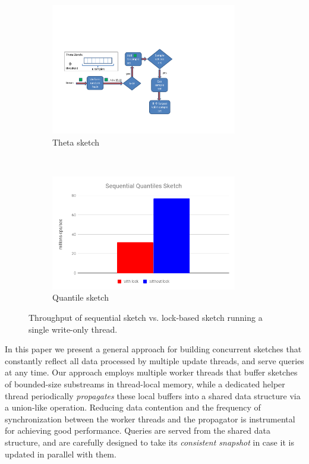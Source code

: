 \begin{figure}[t!]
    \centering
    \begin{subfigure}[t]{0.49\textwidth}
        \centering
        \includegraphics[width=3.2in]{images/seqTheta}
        \caption{Theta sketch}
        \label{fig:LockIsBadTheta}
    \end{subfigure}%
    ~ 
    \begin{subfigure}[t]{0.49\textwidth}
        \centering
        \includegraphics[width=3.2in]{images/seqQuantiles}
        \caption{Quantile sketch}
        \label{fig:LockIsBadQuantiles}
    \end{subfigure}
    \caption{Throughput of sequential sketch vs. lock-based sketch running a single write-only thread.}
    \label{fig:lockBased}
\end{figure}



In this paper 
we present a general approach for building concurrent sketches that
constantly reflect all data processed by multiple update threads, 
and serve queries at any time. %
Our  approach employs multiple worker threads that buffer sketches of bounded-size substreams in thread-local memory, while a dedicated helper thread 
periodically \emph{propagates} these local buffers into a shared data structure via a union-like operation.
 Reducing data contention and the frequency of synchronization between the worker threads and the propagator is instrumental for achieving good performance. Queries are served from the shared data structure, and are carefully 
 designed to take its \emph{consistent snapshot} in case it is updated in parallel with them.

